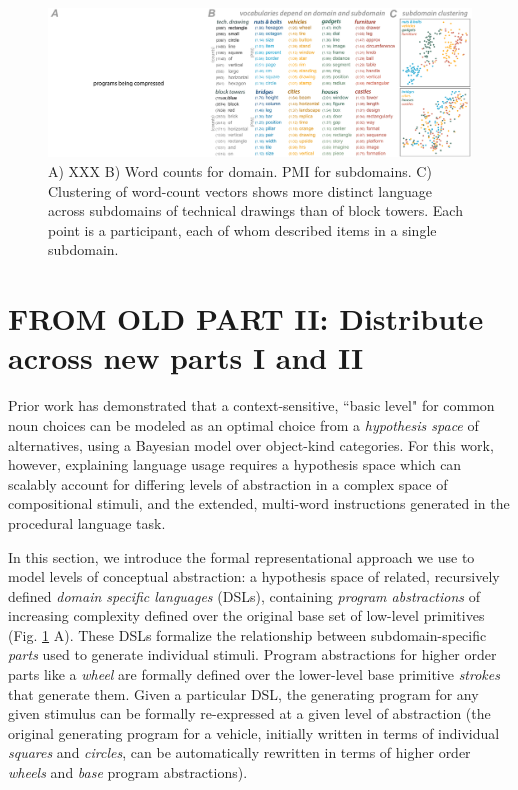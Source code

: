 \documentclass[10pt,letterpaper]{article}
\begin{document}
\begin{figure}
  \begin{center}
  \includegraphics[width=0.98\linewidth]{figures/lax_vocabularies.pdf}
  \caption{A) XXX B) Word counts for domain. PMI for subdomains. C) Clustering of word-count vectors shows more distinct language across subdomains of technical drawings than of block towers. Each point is a participant, each of whom described items in a single subdomain. }
  \label{fig:libraries_correlations}
  \end{center}
  \end{figure}

\section{FROM OLD PART II: Distribute across new parts I and II}

Prior work  has demonstrated that a context-sensitive, ``basic level" for common noun choices can be modeled as an optimal choice from a \textit{hypothesis space} of alternatives, using a Bayesian model over object-kind categories. For this work, however, explaining language usage requires a hypothesis space which can scalably account for differing levels of abstraction in a complex space of compositional stimuli, and the extended, multi-word instructions generated in the procedural language task.

In this section, we introduce the formal representational approach we use to model levels of conceptual abstraction: a hypothesis space of related, recursively defined \textit{domain specific languages} (DSLs), containing \textit{program abstractions} of increasing complexity defined over the original base set of low-level primitives (Fig. \ref{fig:libraries_correlations} A). These DSLs formalize the relationship between subdomain-specific \textit{parts} used to generate individual stimuli. Program abstractions for higher order parts like a \textit{wheel} are formally defined over the lower-level base primitive \textit{strokes} that generate them. Given a particular DSL, the generating program for any given stimulus can be formally re-expressed at a given level of abstraction (the original generating program for a vehicle, initially written in terms of individual \textit{squares} and \textit{circles}, can be automatically rewritten in terms of higher order \textit{wheels} and \textit{base} program abstractions).
\end{document}

